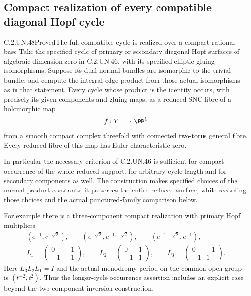 \subsection{Compact realization of every compatible diagonal Hopf cycle}

\begin{statement}{C.2.UN.48}{Proved}{The full compatible cycle is realized over a compact rational base}
Take the specified cycle of primary or secondary diagonal
Hopf surfaces of algebraic dimension zero in C.2.UN.46,
with its specified elliptic gluing isomorphisms.
Suppose its dual-normal bundles are isomorphic to the
trivial bundle, and compute the integral edge product
from those actual isomorphisms as in that statement.
Every cycle whose product is the identity occurs,
with precisely its given components and gluing maps,
as a reduced SNC fibre of a holomorphic map
\[
                 f:Y\longrightarrow\PP^1
\]
from a smooth compact complex threefold with connected
two-torus general fibre. Every reduced fibre of this
map has Euler characteristic zero.

In particular the necessary criterion of C.2.UN.46
is sufficient for compact occurrence of the whole
reduced support, for arbitrary cycle length and for
secondary components as well. The construction makes
specified choices of the normal-product constants;
it preserves the entire reduced surface, while
recording those choices and the actual punctured-family
comparison below.

For example there is a three-component compact
realization with primary Hopf multipliers
\[
 \begin{gathered}
 (e^{-1},e^{-\sqrt2}),\qquad
 (e^{-\sqrt2},e^{-1-\sqrt2}),\qquad
 (e^{-1-\sqrt2},e^{-1}),\\
 L_1=\begin{pmatrix}0&-1\\-1&-1\end{pmatrix},\qquad
 L_2=\begin{pmatrix}0&1\\-1&1\end{pmatrix},\qquad
 L_3=\begin{pmatrix}0&-1\\-1&1\end{pmatrix}.
 \end{gathered}
 \tag{C.HG.1}
\]
Here $L_3L_2L_1=I$ and the actual monodromy period
on the common open group is $(t^{-2},t^2)$.
Thus the longer-cycle occurrence assertion includes
an explicit case beyond the two-component inversion
construction.
\end{statement}

